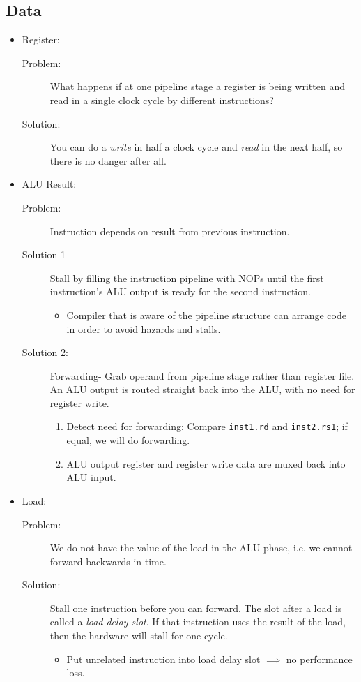 \subsection{Data}
\begin{itemize}
\item Register:
\begin{description}
	\item[Problem:] What happens if at one pipeline stage a register is being written and read in a single clock cycle by different instructions?
	\item[Solution:] You can do a \emph{write} in half a clock cycle and \emph{read} in the next half, so there is no danger after all.
\end{description}

\item ALU Result:
\begin{description}
	\item[Problem:] Instruction depends on result from previous instruction.
	\item[Solution 1] Stall by filling the instruction pipeline with NOPs until the first instruction's ALU output is ready for the second instruction.
	\begin{itemize}
		\item Compiler that is aware of the pipeline structure can arrange code in order to avoid hazards and stalls.
	\end{itemize}
	\item[Solution 2:] Forwarding- Grab operand from pipeline stage rather than register file.
	An ALU output is routed straight back into the ALU, with no need for register write.
	\begin{enumerate}
		\item Detect need for forwarding: Compare \texttt{inst1.rd} and \texttt{inst2.rs1}; if equal, we will do forwarding.
		\item ALU output register and register write data are muxed back into ALU input.
	\end{enumerate}
\end{description}

\item Load:
\begin{description}
	\item[Problem:] We do not have the value of the load in the ALU phase, i.e. we cannot forward backwards in time.
	\item[Solution:] Stall one instruction before you can forward.
		The slot after a load is called a \emph{load delay slot}. If that instruction uses the result of the load, then the hardware will stall for one cycle.
		\begin{itemize}
		    \item Put unrelated instruction into load delay slot $\implies$ no performance loss.
		\end{itemize}
\end{description}
\end{itemize}

